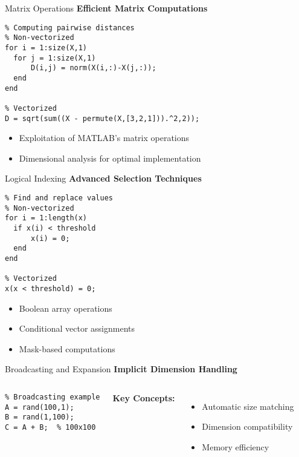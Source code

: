 \documentclass[10pt]{beamer}
\theoremstyle{plain}%
\theoremstyle{definition}
\theoremstyle{remark}
\begin{document}
\begin{frame}[fragile]{Matrix Operations}
  \textbf{Efficient Matrix Computations}
  \begin{lstlisting}
% Computing pairwise distances
% Non-vectorized
for i = 1:size(X,1)
  for j = 1:size(X,1)
      D(i,j) = norm(X(i,:)-X(j,:));
  end
end

% Vectorized
D = sqrt(sum((X - permute(X,[3,2,1])).^2,2));
  \end{lstlisting}
  \begin{itemize}
      \item Exploitation of MATLAB's matrix operations
      \item Dimensional analysis for optimal implementation
  \end{itemize}
\end{frame}

\begin{frame}[fragile]{Logical Indexing}
  \textbf{Advanced Selection Techniques}
  \begin{lstlisting}
% Find and replace values
% Non-vectorized
for i = 1:length(x)
  if x(i) < threshold
      x(i) = 0;
  end
end

% Vectorized
x(x < threshold) = 0;
  \end{lstlisting}
  \begin{itemize}
      \item Boolean array operations
      \item Conditional vector assignments
      \item Mask-based computations
  \end{itemize}
\end{frame}

\begin{frame}[fragile]{Broadcasting and Expansion}
  \textbf{Implicit Dimension Handling}
  \begin{columns}
      \begin{lstlisting}
% Broadcasting example
A = rand(100,1);
B = rand(1,100);
C = A + B;  % 100x100
      \end{lstlisting}
      
      \textbf{Key Concepts:}
      \begin{itemize}
          \item Automatic size matching
          \item Dimension compatibility
          \item Memory efficiency
      \end{itemize}
  \end{columns}
\end{frame}
\end{document}
